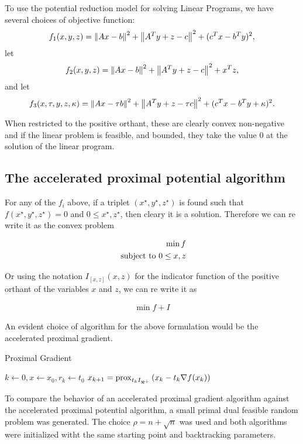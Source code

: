 \documentclass[smallextended]{article}       %
\begin{document}
 To use the potential reduction model for solving Linear Programs, 
 we have several choices of objective function:
 \[
 f_1(x,y,z) = \left\| Ax-b \right\|^2 + \left\| A^Ty+z-c \right\|^2 + (c^Tx-b^Ty)^2,
 \]
 let 
  \[
 f_2(x,y,z) = \left\| Ax-b \right\|^2 + \left\| A^Ty+z-c \right\|^2 + x^Tz,
 \]
 and let
  \[
 f_3(x,\tau,y,z,\kappa) = \left\| Ax-\tau b \right\|^2 + \left\| A^Ty+z-\tau c \right\|^2 + (c^Tx-b^Ty+\kappa)^2.
 \]
 
  When restricted to the positive orthant, these are clearly convex non-negative 
  and if the linear problem is feasible, and bounded, they take the value 0 at the
  solution of the linear program.

 \subsection{The accelerated proximal potential algorithm}

 For any of the $f_i$ above, if a triplet $(x^\star,y^\star,z^\star)$ is found such that $f(x^\star,y^\star,z^\star)=0$ and $0\leq x^\star,z^\star$,
 then cleary it is a solution. Therefore we can re write it as the convex problem

 \begin{align*}
   \min f\\
   \text{ subject to } 0\leq x,z
 \end{align*}
 
 Or using the notation $I_[x,z](x,z)$ for the indicator function of the positive orthant of the variables
 $x$ and $z$, we can re write it as 

 \begin{align*}
   \min f + I
 \end{align*}


 An evident choice of algorithm for the above formulation would
 be the accelerated proximal gradient. 

 \begin{algorithm}
  \caption{Proximal Gradient}
  \begin{algorithmic}
  \STATE $k \gets 0, x \gets x_0, r_k \gets t_0$
  \STATE $x_{k+1} = \operatorname{prox}_{t_k I_{\Re^{+}}}{\left(x_k - t_k \nabla f(x_k)  \right)}$
  \ENDWHILE
  \end{algorithmic}
  \label{alg:pg}
\end{algorithm}

To compare the behavior of an accelerated proximal gradient algorithm against 
 the accelerated proximal potential algorithm, a small 
 primal dual feasible random problem was generated. The choice $\rho = n+\sqrt n$ was 
 used and both algorithms were initialized witht the same starting point and backtracking parameters.
\end{document}
